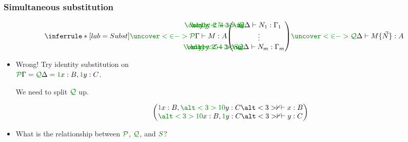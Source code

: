 \documentclass[fleqn]{beamer}
\begin{document}
\begin{frame}
  \frametitle{Simultaneous substitution}
    \[
      \inferrule*[lab=Subst]
      {\ctx{\Gamma}{\uncover<2->{P}} \vdash M : A
        \\ {\begin{pmatrix}
            \phantom{S_1}\rescomment{\mathllap{\only<2-3>{\resctx Q}}\mathllap{\only<4>{\wn}}\mathllap{\only<5->{S_1}}}\Delta
            \vdash N_1 : \Gamma_1 \\
            \vdots \\
            \phantom{S_m}\rescomment{\mathllap{\only<2-3>{\resctx Q}}\mathllap{\only<4>{\wn}}\mathllap{\only<5->{S_m}}}\Delta
            \vdash N_m : \Gamma_m
          \end{pmatrix}}}
      {\ctx{\Delta}{\uncover<2->{Q}} \vdash M\{\vec N\} : A}
    \]
  \begin{itemize}
  \item<3->
    \begin{minipage}[t]{\linewidth}
      \begin{overprint}
        Wrong! Try identity substitution on \\
        $\ctx{\Gamma}{P} = \ctx{\Delta}{Q} = \ctxvar{x}{B}{1}, \ctxvar{y}{C}{1}$.

        We need to split $\resctx{Q}$ up.
      \end{overprint}
      \[
        \begin{pmatrix}
          \ctxvar{x}{B}{1}, \ctxvar{y}{C}{\alt<3>{1}{0}} \alt<3>\nvdash\vdash x
          : B \\
          \ctxvar{x}{B}{\alt<3>{1}{0}}, \ctxvar{y}{C}{1} \alt<3>\nvdash\vdash y
          : C
        \end{pmatrix}
      \]
    \end{minipage}
  \item<5->
    What is the relationship between $\resctx P$, $\resctx Q$, and
    $\rescomment{S}$?
  \end{itemize}
\end{frame}
\end{document}
